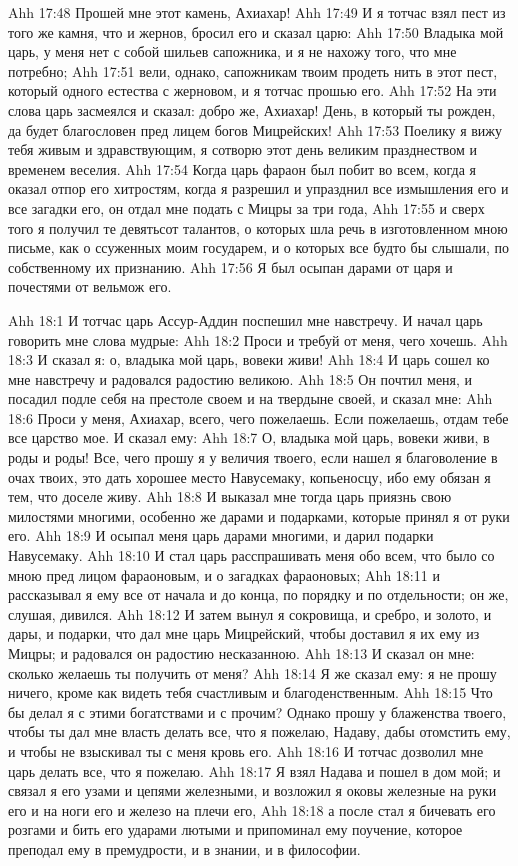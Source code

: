 \vs Ahh 17:48
Прошей мне этот камень, Ахиахар!
\vs Ahh 17:49
И я тотчас взял пест из того же камня, что и жернов, бросил его и сказал царю:
\vs Ahh 17:50
Владыка мой царь, у меня нет с собой шильев сапожника, и я не нахожу того, что мне потребно;
\vs Ahh 17:51
вели, однако, сапожникам твоим продеть нить в этот пест, который одного естества с жерновом, и я тотчас прошью его.
\vs Ahh 17:52
На эти слова царь засмеялся и сказал: добро же, Ахиахар! День, в который ты рожден, да будет благословен пред лицем богов Мицрейских!
\vs Ahh 17:53
Поелику я вижу тебя живым и здравствующим, я сотворю этот день великим празднеством и временем веселия.
\vs Ahh 17:54
Когда царь фараон был побит во всем, когда я оказал отпор его хитростям, когда я разрешил и упразднил все измышления его и все загадки его, он отдал мне подать с Мицры за три года,
\vs Ahh 17:55
и сверх того я получил те девятьсот талантов, о которых шла речь в изготовленном мною письме, как о ссуженных моим государем, и о которых все будто бы слышали, по собственному их признанию.
\vs Ahh 17:56
Я был осыпан дарами от царя и почестями от вельмож его.

\vs Ahh 18:1
И тотчас царь Ассур-Аддин поспешил мне навстречу. И начал царь говорить мне слова мудрые:
\vs Ahh 18:2
Проси и требуй от меня, чего хочешь.
\vs Ahh 18:3
И сказал я: о, владыка мой царь, вовеки живи!
\vs Ahh 18:4
И царь сошел ко мне навстречу и радовался радостию великою.
\vs Ahh 18:5
Он почтил меня, и посадил подле себя на престоле своем и на твердыне своей, и сказал мне:
\vs Ahh 18:6
Проси у меня, Ахиахар, всего, чего пожелаешь. Если пожелаешь, отдам тебе все царство мое. И сказал ему:
\vs Ahh 18:7
О, владыка мой царь, вовеки живи, в роды и роды! Все, чего прошу я у величия твоего, если нашел я благоволение в очах твоих, это дать хорошее место Навусемаку, копьеносцу, ибо ему обязан я тем, что доселе живу.
\vs Ahh 18:8
И выказал мне тогда царь приязнь свою милостями многими, особенно же дарами и подарками, которые принял я от руки его.
\vs Ahh 18:9
И осыпал меня царь дарами многими, и дарил подарки Навусемаку.
\vs Ahh 18:10
И стал царь расспрашивать меня обо всем, что было со мною пред лицом фараоновым, и о загадках фараоновых;
\vs Ahh 18:11
и рассказывал я ему все от начала и до конца, по порядку и по отдельности; он же, слушая, дивился.
\vs Ahh 18:12
И затем вынул я сокровища, и сребро, и золото, и дары, и подарки, что дал мне царь Мицрейский, чтобы доставил я их ему из Мицры; и радовался он радостию несказанною.
\vs Ahh 18:13
И сказал он мне: сколько желаешь ты получить от меня?
\vs Ahh 18:14
Я же сказал ему: я не прошу ничего, кроме как видеть тебя счастливым и благоденственным.
\vs Ahh 18:15
Что бы делал я с этими богатствами и с прочим? Однако прошу у блаженства твоего, чтобы ты дал мне власть делать все, что я пожелаю, Надаву, дабы отомстить ему, и чтобы не взыскивал ты с меня кровь его.
\vs Ahh 18:16
И тотчас дозволил мне царь делать все, что я пожелаю.
\vs Ahh 18:17
Я взял Надава и пошел в дом мой; и связал я его узами и цепями железными, и возложил я оковы железные на руки его и на ноги его и железо на плечи его,
\vs Ahh 18:18
а после стал я бичевать его розгами и бить его ударами лютыми и припоминал ему поучение, которое преподал ему в премудрости, и в знании, и в философии.

